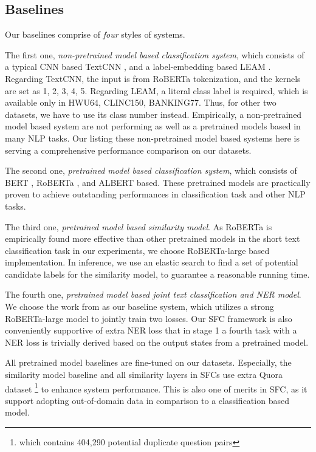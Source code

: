 \subsection{Baselines}
Our baselines comprise of \emph{four} styles of systems. 

The first one, \emph{non-pretrained model based classification system}, which consists of a typical CNN based TextCNN \cite{kim2014convolutional}, and a label-embedding based LEAM \cite{wang2018joint}. 
Regarding TextCNN, the input is from RoBERTa tokenization, and the kernels are set as 1, 2, 3, 4, 5. 
Regarding LEAM, a literal class label is required, which is available only in HWU64, CLINC150, BANKING77. 
Thus, for other two datasets, we have to use its class number instead. 
Empirically, a non-pretrained model based system are not performing as well as a pretrained models based in many NLP tasks.
Our listing these non-pretrained model based systems here is serving a comprehensive performance comparison on our datasets.

The second one, \emph{pretrained model based classification system}, which consists of BERT \cite{devlin2018bert}, RoBERTa \cite{liu2019roberta}, and ALBERT \cite{lan2019albert} based. 
These pretrained models are practically proven to achieve outstanding performances in classification task and other NLP tasks.

The third one, \emph{pretrained model based similarity model}. 
As RoBERTa is empirically found more effective than other pretrained models in the short text classification task in our experiments, we choose RoBERTa-large based implementation.
In inference, we use an elastic search to find a set of potential candidate labels for the similarity model, to guarantee a reasonable running time.

The fourth one, \emph{pretrained model based joint text classification and NER model}. 
We choose the work from \cite{chen2019bert} as our baseline system, which utilizes a strong RoBERTa-large model to jointly train two losses.
Our SFC framework is also conveniently supportive of extra NER loss that in stage 1 a fourth task with a NER loss is trivially derived based on the output states from a pretrained model.

All pretrained model baselines are fine-tuned on our datasets.
Especially, the similarity model baseline and all similarity layers in SFCs use extra Quora dataset \cite{iyer2017first} \footnote{which contains 404,290 potential duplicate question pairs} to enhance system performance. 
This is also one of merits in SFC, as it support adopting out-of-domain data in comparison to a classification based model.


